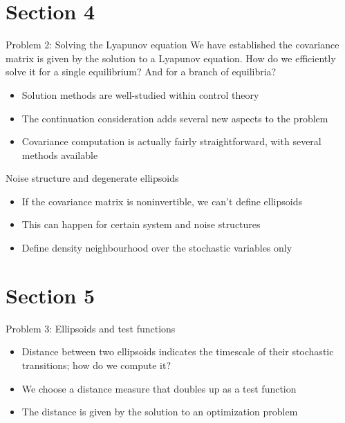 \documentclass[presentation]{beamer}
\begin{document}
\section{Section 4}
\label{sec:org5f71d13}
\begin{frame}[label={sec:orgca99866}]{Problem 2: Solving the Lyapunov equation}
We have established the covariance matrix is given by the solution to a Lyapunov equation. How do we efficiently solve it for a single equilibrium? And for a branch of equilibria?

\begin{itemize}
\item Solution methods are well-studied within control theory
\end{itemize}
\vfill
\begin{itemize}
\item The continuation consideration adds several new aspects to the problem
\end{itemize}
\vfill
\begin{itemize}
\item Covariance computation is actually fairly straightforward, with several methods available
\end{itemize}
\end{frame}

\begin{frame}[label={sec:org2e19fcb}]{Noise structure and degenerate ellipsoids}
\begin{itemize}
\item If the covariance matrix is noninvertible, we can't define ellipsoids
\end{itemize}
\vfill
\begin{itemize}
\item This can happen for certain system and noise structures
\end{itemize}
\vfill
\begin{itemize}
\item Define density neighbourhood over the stochastic variables only
\end{itemize}
\end{frame}

\section{Section 5}
\label{sec:org92ec3c2}
\begin{frame}[label={sec:org1cddb9e}]{Problem 3: Ellipsoids and test functions}
\begin{itemize}
\item Distance between two ellipsoids indicates the timescale of their stochastic transitions; how do we compute it?
\end{itemize}
\vfill
\begin{itemize}
\item We choose a distance measure that doubles up as a test function
\end{itemize}
\vfill
\begin{itemize}
\item The distance is given by the solution to an optimization problem
\end{itemize}
\end{frame}
\end{document}

